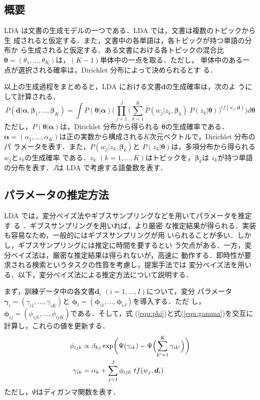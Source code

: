 \documentclass[japanese]{jnlp_1.4}
\begin{document}
\subsection{概要}

LDA は文書の生成モデルの一つである．LDA では，文書は複数のトピックから生
成されると仮定する．また，文書中の各単語は，各トピックが持つ単語の分布か
ら生成されると仮定する．ある文書における各トピックの混合比$\bm{\theta} =
(\theta_{1}, \dots, \theta_{K})$は，$(K - 1)$単体中の一点を取る．ただし，
単体中のある一点が選択される確率は，Dirichlet 分布によって決められるとす
る．

以上の生成過程をまとめると，LDA における文書$\bm{d}$の生成確率は，次のよ
うにして計算される．
\begin{equation}
 P(\bm{d}|\bm{\alpha},\bm{\beta}_{1}, \dots, \bm{\beta}_{K})
 = \int
 P(\bm{\theta}|\bm{\alpha})
 \Biggl(
 \prod_{j=1}^{J}
 \biggl(
 \sum_{k=1}^{K}
 P(w_{j}|z_{k},\bm{\beta}_{k}) \ P(z_{k}|\bm{\theta})
 \biggr)
 ^{tf(w_{j},\bm{d})}
 \Biggr)
 d\bm{\theta}
 \label{equ:lda}
\end{equation}
ただし，$P(\bm{\theta}|\bm{\alpha})$は，Dirichlet 分布から得られる
$\bm{\theta}$の生成確率である．$\bm{\alpha} = (\alpha_{1}, \dots,
\alpha_{K})$は正の実数から構成される$K$次元ベクトルで，Dirichlet 分布のパ
ラメータを表す．また，$P(w_{j}|z_{k},\bm{\beta}_{k})$と
$P(z_{k}|\bm{\theta})$は，多項分布から得られる$w_{j}$と$z_{k}$の生成確率
である．$z_{k}$ $(k = 1, \dots, K)$はトピックを，$\bm{\beta}_{k}$は
$z_{k}$が持つ単語の分布を表す．$J$は LDA で考慮する語彙数を表す．



\subsection{パラメータの推定方法} \label{ssec:parameter_estimation}

LDA では，変分ベイズ法やギブスサンプリングなどを用いてパラメータを推定す
る \cite{Blei2003,Griffiths2004}．ギブスサンプリングを用いれば，より厳密
な推定結果が得られる．実装も容易なため，一般的にはギブスサンプリングが用
いられることが多い．しかし，ギブスサンプリングには推定に時間を要するとい
う欠点がある．一方，変分ベイズ法は，厳密な推定結果は得られないが，高速に
動作する．即時性が要求される検索というタスクの性質を考慮し，提案手法では
変分ベイズ法を用いる．以下，変分ベイズ法による推定方法について説明する．

まず，訓練データ中の各文書$\bm{d}_{i}$ $(i = 1, \dots, I)$について，変分
パラメータ$\bm{\gamma}_{i} = (\gamma_{i1}, \dots, \gamma_{iK})$と
$\bm{\phi}_{i} = (\bm{\phi}_{i1}, \dots, \bm{\phi}_{iJ})$を導入する．ただ
し，$\bm{\phi}_{ij} = (\phi_{ij1}, \dots, \phi_{ijK})$である．そして，式
(\ref{equ:phi})と式(\ref{equ:gamma})を交互に計算し，これらの値を更新する．
\begin{align}
\phi_{ijk}
 & \propto \beta_{kj} \exp\biggl( \Psi(\gamma_{ik}) -
 \Psi\Bigl(\sum\limits_{k'=1}^{K} \gamma_{ik'}\Bigr)\biggr)
 \label{equ:phi}
 \\
\gamma_{ik}
 & = \alpha_{k} + \sum\limits_{j=1}^{J} \phi_{ijk} \ tf(w_{j},\bm{d}_{i})
 \label{equ:gamma}
\end{align}
ただし，$\Psi$はディガンマ関数を表す．
\end{document}
